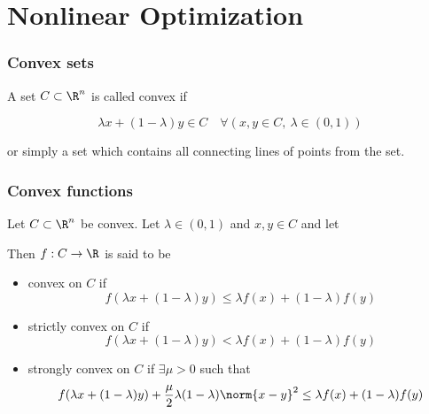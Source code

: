 \section{Nonlinear Optimization}\label{d1c9db1}

\subsubsection{Convex sets}

A set $C\subset\R^n$ is called convex if

$$
	\lambda x  + (1-\lambda ) y \in C
	\quad
	\forall(x,y\in C,\ \lambda \in (0, 1))
$$

or simply a set which contains all connecting lines of points from the
set.

\subsubsection{Convex functions}

Let $C\subset\R^n$ be convex. Let $\lambda\in(0,1)$ and $x,y\in C$ and
let

Then $f:C\to\R$ is said to be

\begin{itemize}
	\item convex on $C$ if
	      $$f(\lambda x+(1-\lambda)y)\leq\lambda f(x)+(1-\lambda)f(y)$$
	\item strictly convex on $C$ if
	      $$f(\lambda x+(1-\lambda)y)<\lambda f(x)+(1-\lambda)f(y)$$
	\item strongly convex on $C$ if $\exists\mu>0$ such that
	      $$f(\lambda x+(1-\lambda)y)+\frac{\mu}{2}\lambda(1-\lambda)\norm{x-y}^2\leq\lambda f(x)+(1-\lambda)f(y)$$
\end{itemize}

